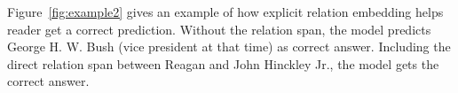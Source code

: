 Figure~\ref{fig:example2} gives an example of how explicit relation embedding helps reader get a correct prediction. Without the 
relation span, the model predicts George H. W. Bush (vice president at that time) as correct answer. Including the direct relation
span between Reagan and John Hinckley Jr., 
the model gets the correct answer.





